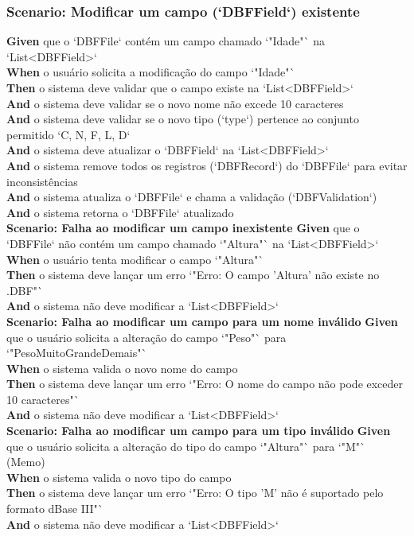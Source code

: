 \subsubsection{Scenario: Modificar um campo (`DBFField`) existente}
\textbf{Given} que o `DBFFile` contém um campo chamado `"Idade"` na `List<DBFField>` \\
\textbf{When} o usuário solicita a modificação do campo `"Idade"` \\
\textbf{Then} o sistema deve validar que o campo existe na `List<DBFField>` \\
\textbf{And} o sistema deve validar se o novo nome não excede 10 caracteres \\
\textbf{And} o sistema deve validar se o novo tipo (`type`) pertence ao conjunto permitido `{C, N, F, L, D}` \\
\textbf{And} o sistema deve atualizar o `DBFField` na `List<DBFField>` \\
\textbf{And} o sistema remove todos os registros (`DBFRecord`) do `DBFFile` para evitar inconsistências \\
\textbf{And} o sistema atualiza o `DBFFile` e chama a validação (`DBFValidation`) \\
\textbf{And} o sistema retorna o `DBFFile` atualizado \\

\textbf{Scenario: Falha ao modificar um campo inexistente}
\textbf{Given} que o `DBFFile` não contém um campo chamado `"Altura"` na `List<DBFField>` \\
\textbf{When} o usuário tenta modificar o campo `"Altura"` \\
\textbf{Then} o sistema deve lançar um erro `"Erro: O campo 'Altura' não existe no .DBF"` \\
\textbf{And} o sistema não deve modificar a `List<DBFField>` \\

\textbf{Scenario: Falha ao modificar um campo para um nome inválido}
\textbf{Given} que o usuário solicita a alteração do campo `"Peso"` para `"PesoMuitoGrandeDemais"` \\
\textbf{When} o sistema valida o novo nome do campo \\
\textbf{Then} o sistema deve lançar um erro `"Erro: O nome do campo não pode exceder 10 caracteres"` \\
\textbf{And} o sistema não deve modificar a `List<DBFField>` \\

\textbf{Scenario: Falha ao modificar um campo para um tipo inválido}
\textbf{Given} que o usuário solicita a alteração do tipo do campo `"Altura"` para `"M"` (Memo) \\
\textbf{When} o sistema valida o novo tipo do campo \\
\textbf{Then} o sistema deve lançar um erro `"Erro: O tipo 'M' não é suportado pelo formato dBase III"` \\
\textbf{And} o sistema não deve modificar a `List<DBFField>` \\

